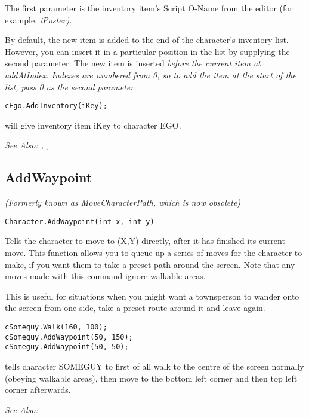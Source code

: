 The first parameter is the inventory item's Script O-Name from the editor (for
example, \it{iPoster}).

By default, the new item is added to the end of the character's inventory list. However,
you can insert it in a particular position in the list by supplying the second parameter.
The new item is inserted \it{before} the current item at \it{addAtIndex}. Indexes are
numbered from 0, so to add the item at the start of the list, pass 0 as the second parameter.

\begin{verbatim}
cEgo.AddInventory(iKey);
\end{verbatim}
will give inventory item iKey to character EGO.

\it{See Also:} ,
,


\subsection{AddWaypoint}\label{Character.AddWaypoint}%

\it{(Formerly known as MoveCharacterPath, which is now obsolete)}

\begin{verbatim}
Character.AddWaypoint(int x, int y)
\end{verbatim}
Tells the character to move to (X,Y) directly, after it has finished its current
move. This function allows you to queue up a series of moves for the character to make, if
you want them to take a preset path around the screen. Note that any moves made with
this command ignore walkable areas.

This is useful for situations when you might want a townsperson to wander onto the screen
from one side, take a preset route around it and leave again.

\begin{verbatim}
cSomeguy.Walk(160, 100);
cSomeguy.AddWaypoint(50, 150);
cSomeguy.AddWaypoint(50, 50);
\end{verbatim}
tells character SOMEGUY to first of all walk to the centre of the screen normally (obeying
walkable areas), then move to the bottom left corner and then top left corner afterwards.

\it{See Also:} 


